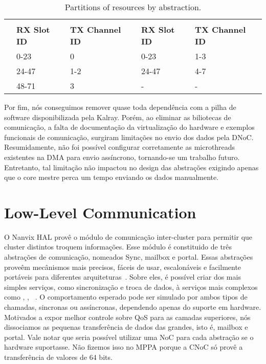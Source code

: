		\begin{table}[!tb]
			\centering%
			\caption{Partitions of \noc resources by abstraction.}%
			\label{tab.noc-resources}%

			\begin{tabular}{l|l|l|l|l|}
				\cline{2-5}
														& \multicolumn{2}{c|}{\textbf{\cnoc}}          & \multicolumn{2}{c|}{\textbf{\dnoc}}          \\ \cline{2-5}
														& \textbf{RX Slot ID} & \textbf{TX Channel ID} & \textbf{RX Slot ID} & \textbf{TX Channel ID} \\ \hline
				\multicolumn{1}{|l|}{\textbf{\mailbox}} & 0-23                & 0                      & 0-23                & 1-3                    \\ \hline
				\multicolumn{1}{|l|}{\textbf{\portal}}  & 24-47               & 1-2                    & 24-47               & 4-7                    \\ \hline
				\multicolumn{1}{|l|}{\textbf{\sync}}    & 48-71               & 3                      & -                   & -                      \\ \hline
			\end{tabular}

		\end{table}

		Por fim, nós conseguimos remover quase toda dependência com a pilha de software disponibilizada pela Kalray.
		Porém, ao eliminar as biliotecas de comunicação, a falta de documentação da virtualização do hardware e exemplos funcionais de comunicação, surgiram limitações no envio dos dados pela DNoC.
		Resumidamente, não foi possível configurar corretamente as microthreads existentes na DMA para envio assíncrono, tornando-se um trabalho futuro.
		Entretanto, tal limitação não impactou no design das abstrações exigindo apenas que o core mestre perca um tempo enviando os dados manualmente.

	\section{Low-Level Communication}
	\label{sec.low-level-comm}

		O Nanvix HAL provê o módulo de comunicação inter-cluster para permitir que cluster distintos troquem informações.
		Esse módulo é constituido de três abstrações de comunicação, nomeados Sync, mailbox e portal.
		Essas abstrações proveêm mecânismos mais precisos, fáceis de usar, escalonáveis e facilmente portáveis para diferentes arquiteturas~\cite{fleets}.
		Sobre eles, é possível criar dos mais simples serviços, como sincronização e troca de dados, à serviços mais complexos como \shm, \semaphone, \rmen~\cite{penna:rmen}.
		O comportamento esperado pode ser simulado por ambos tipos de chamadas, sincronas ou assíncronas, dependendo apenas do suporte em hardware.
		Motivados a expor melhor controle sobre QoS para as camadas superiores, nós dissociamos as pequenas transferência de dados das grandes, isto é, mailbox e portal.
		Vale notar que seria possível utilizar uma NoC para cada abstração se o hardware suportasse.
		Não fizemos isso no MPPA porque a CNoC só provê a transferência de valores de 64 bits.

